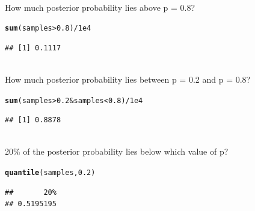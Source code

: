 \documentclass[12pt]{article}\usepackage[]{graphicx}\usepackage[]{color}
\makeatletter
\newcommand{\hlnum}[1]{\textcolor[rgb]{0.686,0.059,0.569}{#1}}%
\newcommand{\hlopt}[1]{\textcolor[rgb]{0,0,0}{#1}}%
\newcommand{\hlstd}[1]{\textcolor[rgb]{0.345,0.345,0.345}{#1}}%
\newcommand{\hlkwd}[1]{\textcolor[rgb]{0.737,0.353,0.396}{\textbf{#1}}}%
\newenvironment{kframe}{%
 \def\at@end@of@kframe{}%
 \ifinner\ifhmode%
  \def\at@end@of@kframe{\end{minipage}}%
  \begin{minipage}{\columnwidth}%
 \fi\fi%
 \def\FrameCommand##1{\hskip\@totalleftmargin \hskip-\fboxsep
 \colorbox{shadecolor}{##1}\hskip-\fboxsep
     \hskip-\linewidth \hskip-\@totalleftmargin \hskip\columnwidth}%
 \MakeFramed {\advance\hsize-\width
   \@totalleftmargin\z@ \linewidth\hsize
   \@setminipage}}%
 {\par\unskip\endMakeFramed%
 \at@end@of@kframe}
\newenvironment{knitrout}{}{} %
\newenvironment{problem}[2][Problem]{\begin{trivlist}
\item[\hskip \labelsep {\bfseries #1}\hskip \labelsep {\bfseries #2.}]}{\end{trivlist}}
\makeatother
\begin{document}
\begin{problem}{3E2}
\text{}\\
How much posterior probability lies above p = 0.8?
\end{problem}

\begin{knitrout}
\color{fgcolor}\begin{kframe}
\begin{alltt}
\hlkwd{sum}\hlstd{(samples} \hlopt{>} \hlnum{0.8}\hlstd{)} \hlopt{/} \hlnum{1e4}
\end{alltt}
\begin{verbatim}
## [1] 0.1117
\end{verbatim}
\end{kframe}
\end{knitrout}

\begin{problem}{3E3}
\text{}\\
How much posterior probability lies between p = 0.2 and p = 0.8?
\end{problem}

\begin{knitrout}
\color{fgcolor}\begin{kframe}
\begin{alltt}
\hlkwd{sum}\hlstd{(samples} \hlopt{>} \hlnum{0.2} \hlopt{&} \hlstd{samples} \hlopt{<} \hlnum{0.8}\hlstd{)} \hlopt{/} \hlnum{1e4}
\end{alltt}
\begin{verbatim}
## [1] 0.8878
\end{verbatim}
\end{kframe}
\end{knitrout}

\begin{problem}{3E4}
\text{}\\
20\% of the posterior probability lies below which value of p?
\end{problem}

\begin{knitrout}
\color{fgcolor}\begin{kframe}
\begin{alltt}
\hlkwd{quantile}\hlstd{(samples,} \hlnum{0.2}\hlstd{)}
\end{alltt}
\begin{verbatim}
##       20% 
## 0.5195195
\end{verbatim}
\end{kframe}
\end{knitrout}
\end{document}
